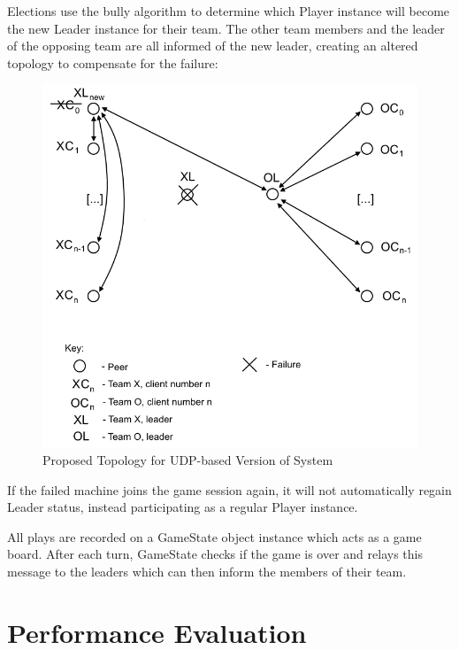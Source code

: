 \documentclass[conference]{IEEEtran}
\begin{document}
Elections use the bully algorithm to determine which Player instance will become the new Leader instance for their team. The other team members and the leader of the opposing team are all informed of the new leader, creating an altered topology to compensate for the failure:

\begin{figure}[h]
	\includegraphics[width=\linewidth]{images/DAS-topology-election.png}
	\caption{Proposed Topology for UDP-based Version of System}
	\label{fig:topology-election}
\end{figure}

If the failed machine joins the game session again, it will not automatically regain Leader status, instead participating as a regular Player instance.

All plays are recorded on a GameState object instance which acts as a game board. After each turn, GameState checks if the game is over and relays this message to the leaders which can then inform the members of their team.



\section{Performance Evaluation}
\end{document}
